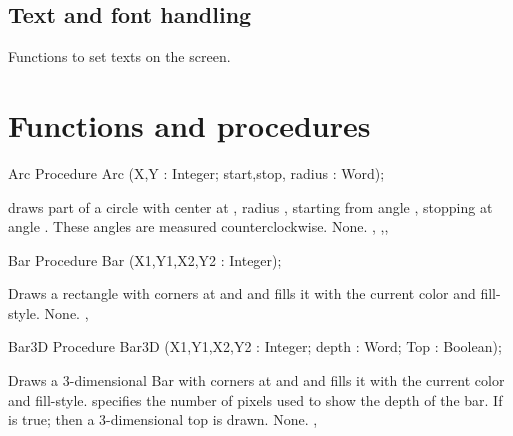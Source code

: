 \subsection{Text and font handling}
Functions to set texts on the screen.
\begin{funclist}
\end{funclist}


\section{Functions and procedures}

\begin{procedure}{Arc}
\Declaration
Procedure Arc (X,Y : Integer; start,stop, radius : Word);

\Description
  draws part of a circle with center at , radius
, starting from angle , stopping at angle .
These  angles are measured
counterclockwise.
\Errors
None.
\SeeAlso
{}, 
,, 
\end{procedure}

\begin{procedure}{Bar}
\Declaration
Procedure Bar (X1,Y1,X2,Y2 : Integer);

\Description
Draws a rectangle with corners at  and  
and fills it with the current color and fill-style.
\Errors
None.
\SeeAlso
{}, 
\end{procedure}

\begin{procedure}{Bar3D}
\Declaration
Procedure Bar3D (X1,Y1,X2,Y2 : Integer; depth : Word; Top : Boolean);

\Description
Draws a 3-dimensional Bar  with corners at  and  
and fills it with the current color and fill-style.
 specifies the number of pixels used to show the depth of the
bar.
If  is true; then a 3-dimensional top is drawn.
\Errors
None.
\SeeAlso
{}, 
\end{procedure}

